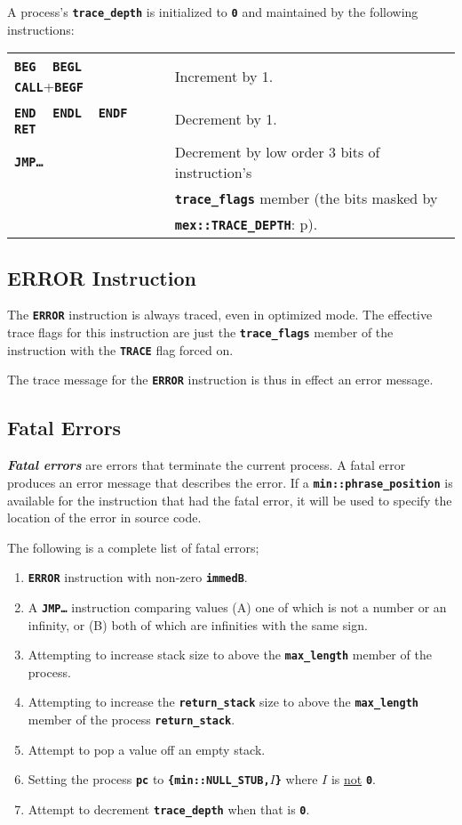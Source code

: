 \documentclass[12pt]{article}
\newcommand{\TT}[1]{{\tt \bfseries #1}}
\newcommand{\ikey}[2]{{\bf \em #1}\index{#2}}
\newcommand{\pagref}[1]{p\pageref{#1}}
\begin{document}
A process's \TT{trace\_depth} is initialized to \TT{0} and maintained
by the following instructions:
\begin{center}
\begin{tabular}{l@{~~~~}l}
\TT{BEG} ~ \TT{BEGL} ~ \TT{CALL}+\TT{BEGF} & Increment by 1. \\
\TT{END} ~ \TT{ENDL} ~ \TT{ENDF} ~ \TT{RET} & Decrement by 1. \\
\TT{JMP\ldots} & Decrement by low order 3 bits of instruction's \\
               & \TT{trace\_flags} member (the bits masked by \\
               & \TT{mex::TRACE\_DEPTH}: \pagref{MEX::TRACE_DEPTH}). \\
\end{tabular}
\end{center}

\subsection{ERROR Instruction}
\label{ERROR-INSTRUCTION}

The \TT{ERROR} instruction is always traced, even in optimized mode.
The effective trace flags for this instruction are just the
\TT{trace\_flags} member of the instruction with the \TT{TRACE} flag forced on.

The trace message for the \TT{ERROR} instruction is thus in effect an
error message.

\subsection{Fatal Errors}
\label{FATAL-ERRORS}

\ikey{Fatal errors}{fatal error} are errors that terminate the current
process.  A fatal error produces an error message that describes the
error.  If a \TT{min::phrase\_position} is available for the instruction
that had the fatal error, it will be used to specify the location
of the error in source code.

The following is a complete list of fatal errors;
\begin{enumerate}
\item \TT{ERROR} instruction with non-zero \TT{immedB}.
\item A \TT{JMP\ldots} instruction comparing values
(A) one of which is not a number or an infinity, or
(B) both of which are infinities with the same sign.
\item Attempting to increase stack size to above the \TT{max\_length}
member of the process.
\item Attempting to increase the \TT{return\_stack}
size to above the \TT{max\_length} member of the process \TT{return\_stack}.
\item Attempt to pop a value off an empty stack.
\item Setting the process \TT{pc} to \TT{\{min::NULL\_STUB,$I$\}} where
$I$ is \underline{not} \TT{0}.
\item Attempt to decrement \TT{trace\_depth} when that is \TT{0}.

\end{enumerate}
\end{document}
